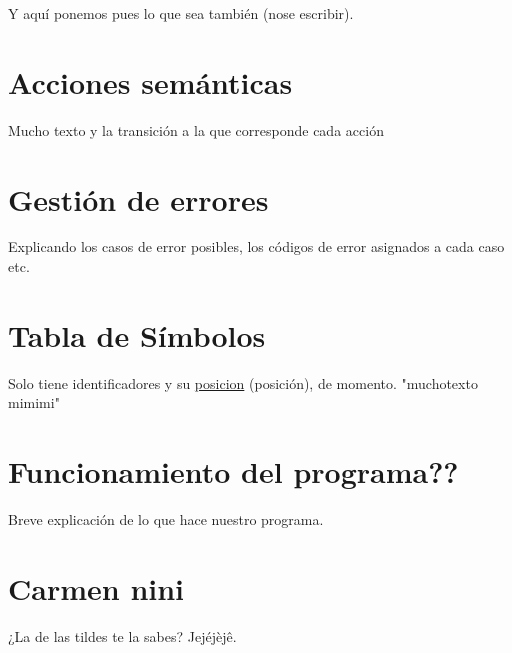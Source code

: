 \documentclass{article}
\begin{document}


Y aquí ponemos pues lo que sea también (nose escribir).

\section{Acciones semánticas}
Mucho texto y la transición a la que corresponde cada acción

\section{Gestión de errores}
Explicando los casos de error posibles, los códigos de error asignados a cada caso etc.

\section{Tabla de Símbolos}
Solo tiene identificadores y su \underline{posicion} (posición), de momento. "muchotexto mimimi"

\section{Funcionamiento del programa??}
Breve explicación de lo que hace nuestro programa.

\section{Carmen nini}
¿La de las tildes te la sabes? Jejéjèjê.
\end{document}
